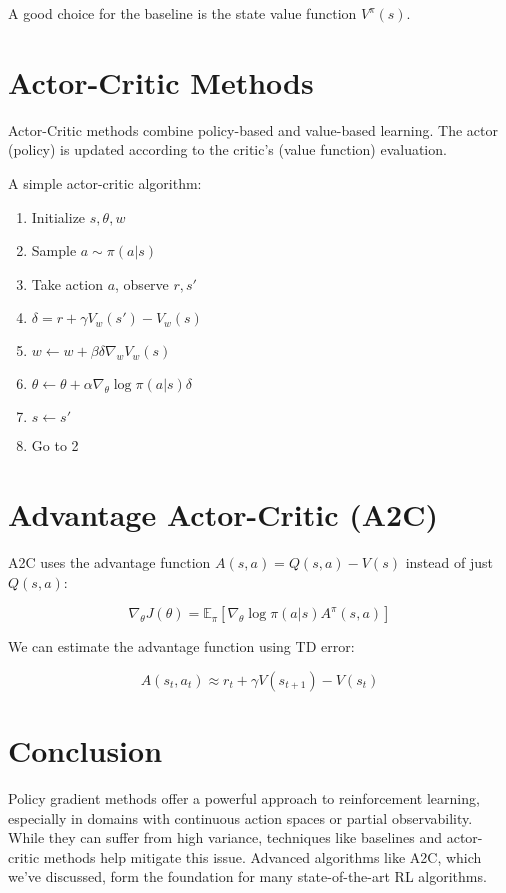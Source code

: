 \documentclass{article}
\begin{document}
A good choice for the baseline is the state value function $V^\pi(s)$.

\section{Actor-Critic Methods}

Actor-Critic methods combine policy-based and value-based learning. The actor (policy) is updated according to the critic's (value function) evaluation.

A simple actor-critic algorithm:

\begin{enumerate}
    \item Initialize $s, \theta, w$
    \item Sample $a \sim \pi(a|s)$
    \item Take action $a$, observe $r, s'$
    \item $\delta = r + \gamma V_w(s') - V_w(s)$  %
    \item $w \leftarrow w + \beta \delta \nabla_w V_w(s)$  %
    \item $\theta \leftarrow \theta + \alpha \nabla_\theta \log \pi(a|s) \delta$  %
    \item $s \leftarrow s'$
    \item Go to 2
\end{enumerate}

\section{Advantage Actor-Critic (A2C)}

A2C uses the advantage function $A(s,a) = Q(s,a) - V(s)$ instead of just $Q(s,a)$:

\begin{equation}
    \nabla_\theta J(\theta) = \mathbb{E}_\pi[\nabla_\theta \log \pi(a|s) A^\pi(s,a)]
\end{equation}

We can estimate the advantage function using TD error:

\begin{equation}
    A(s_t, a_t) \approx r_t + \gamma V(s_{t+1}) - V(s_t)
\end{equation}

\section{Conclusion}

Policy gradient methods offer a powerful approach to reinforcement learning, especially in domains with continuous action spaces or partial observability. While they can suffer from high variance, techniques like baselines and actor-critic methods help mitigate this issue. Advanced algorithms like A2C, which we've discussed, form the foundation for many state-of-the-art RL algorithms.
\end{document}
